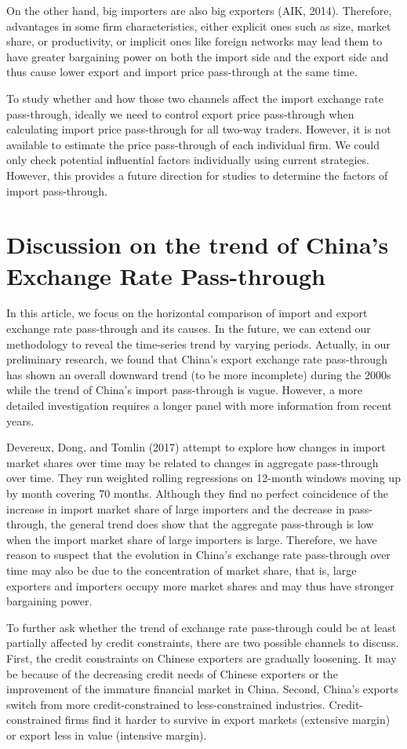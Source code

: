 On the other hand, big importers are also big exporters (AIK, 2014\cite{aik2014}). Therefore, advantages in some firm characteristics, either explicit ones such as size, market share, or productivity, or implicit ones like foreign networks may lead them to have greater bargaining power on both the import side and the export side and thus cause lower export and import price pass-through at the same time. 

To study whether and how those two channels affect the import exchange rate pass-through, ideally we need to control export price pass-through when calculating import price pass-through for all two-way traders. However, it is not available to estimate the price pass-through of each individual firm. We could only check potential influential factors individually using current strategies. However, this provides a future direction for studies to determine the factors of import pass-through.

\section{Discussion on the trend of  China’s Exchange Rate Pass-through}

In this article, we focus on the horizontal comparison of import and export exchange rate pass-through and its causes. In the future, we can extend our methodology to reveal the time-series trend by varying periods. Actually, in our preliminary research, we found that China's export exchange rate pass-through has shown an overall downward trend (to be more incomplete) during the 2000s while the trend of China's import pass-through is vague. However, a more detailed investigation requires a longer panel with more information from recent years. 

Devereux, Dong, and Tomlin (2017)\cite{devereux2017} attempt to explore how changes in import market shares over time may be related to changes in aggregate pass-through over time. They run weighted rolling regressions on 12-month windows moving up by month covering 70 months. Although they find no perfect coincidence of the increase in import market share of large importers and the decrease in pass-through, the general trend does show that the aggregate pass-through is low when the import market share of large importers is large. Therefore, we have reason to suspect that the evolution in China's exchange rate pass-through over time may also be due to the concentration of market share, that is, large exporters and importers occupy more market shares and may thus have stronger bargaining power.

To further ask whether the trend of exchange rate pass-through could be at least partially affected by credit constraints, there are two possible channels to discuss. First, the credit constraints on Chinese exporters are gradually loosening. It may be because of the decreasing credit needs of Chinese exporters or the improvement of the immature financial market in China. Second, China's exports switch from more credit-constrained to less-constrained industries. Credit-constrained firms find it harder to survive in export markets (extensive margin) or export less in value (intensive margin).
